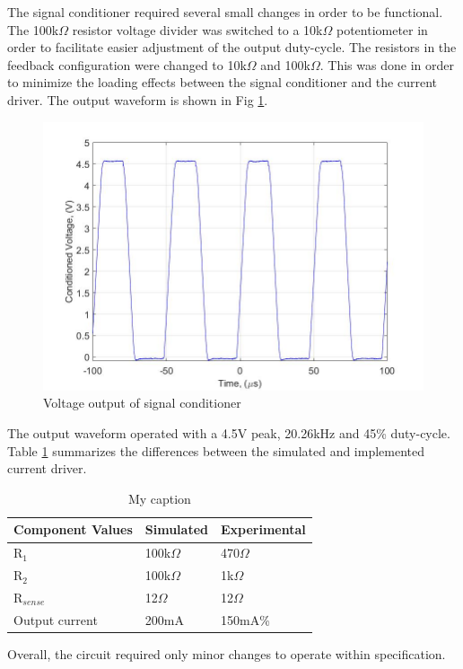 
The signal conditioner required several small changes in order to be functional. The 100k$\Omega$ resistor voltage divider was switched to a 10k$\Omega$ potentiometer in order to facilitate easier adjustment of the output duty-cycle. The resistors in the feedback configuration were changed to 10k$\Omega$ and 100k$\Omega$. This was done in order to minimize the loading effects between the signal conditioner and the current driver. The output waveform is shown in Fig \ref{fig:conditionedvoltagelab4}.

\begin{figure}[H]
	\centering
	\includegraphics[width=0.7\linewidth]{ExperimentalImplementation/conditioned_voltage_lab4}
	\caption[Experimental signal conditioner]{Voltage output of signal conditioner}
	\label{fig:conditionedvoltagelab4}
\end{figure}

The output waveform operated with a 4.5V peak, 20.26kHz and 45\% duty-cycle. Table \ref{tab:currentdriver} summarizes the differences between the simulated and implemented current driver.  


\begin{table}[H]
	\centering
	\caption{My caption}
	\label{tab:currentdriver}
	\begin{tabular}{|l|l|l|}
		\hline
		Component Values & Simulated  & Experimental \\ \hline
		R$_1$            & 100k$\Omega$      & 470$\Omega$        \\ \hline
		R$_2$            & 100k$\Omega$      & 1k$\Omega$      \\ \hline
		R$_{sense}$      & 12$\Omega$ & 12$\Omega$   \\ \hline
		Output current   & 200mA       & 150mA\%       \\ \hline
	\end{tabular}
\end{table}

Overall, the circuit required only minor changes to operate within specification.

